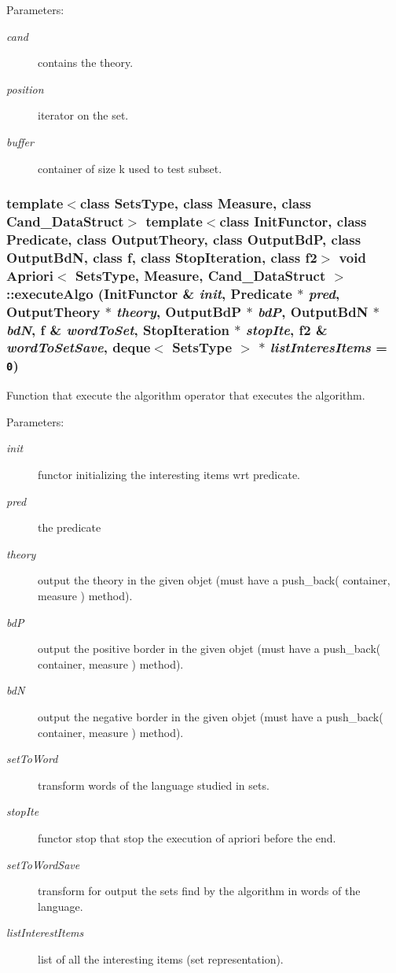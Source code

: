 \begin{Desc}
\item[Parameters:]
\begin{description}
\item[{\em cand}]contains the theory. \item[{\em position}]iterator on the set. \item[{\em buffer}]container of size k used to test subset. \end{description}
\end{Desc}
\subsubsection{\setlength{\rightskip}{0pt plus 5cm}template$<$class Sets\-Type, class Measure, class Cand\_\-Data\-Struct$>$ template$<$class Init\-Functor, class Predicate, class Output\-Theory, class Output\-Bd\-P, class Output\-Bd\-N, class f, class Stop\-Iteration, class f2$>$ void {\bf Apriori}$<$ Sets\-Type, Measure, Cand\_\-Data\-Struct $>$::execute\-Algo (Init\-Functor \& {\em init}, {\bf Predicate} $\ast$ {\em pred}, Output\-Theory $\ast$ {\em theory}, Output\-Bd\-P $\ast$ {\em bd\-P}, Output\-Bd\-N $\ast$ {\em bd\-N}, f \& {\em word\-To\-Set}, Stop\-Iteration $\ast$ {\em stop\-Ite}, f2 \& {\em word\-To\-Set\-Save}, deque$<$ Sets\-Type $>$ $\ast$ {\em list\-Interes\-Items} = {\tt 0})}\label{class_apriori_cef957e8ca48064546d3aed66c1927c7}


Function that execute the algorithm operator that executes the algorithm. 

\begin{Desc}
\item[Parameters:]
\begin{description}
\item[{\em init}]functor initializing the interesting items wrt predicate. \item[{\em pred}]the predicate \item[{\em theory}]output the theory in the given objet (must have a push\_\-back( container, measure ) method). \item[{\em bd\-P}]output the positive border in the given objet (must have a push\_\-back( container, measure ) method). \item[{\em bd\-N}]output the negative border in the given objet (must have a push\_\-back( container, measure ) method). \item[{\em set\-To\-Word}]transform words of the language studied in sets. \item[{\em stop\-Ite}]functor stop that stop the execution of apriori before the end. \item[{\em set\-To\-Word\-Save}]transform for output the sets find by the algorithm in words of the language. \item[{\em list\-Interest\-Items}]list of all the interesting items (set representation). \end{description}
\end{Desc}
